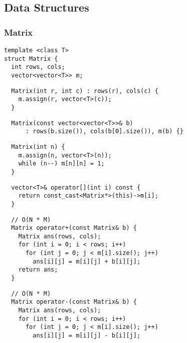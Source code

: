 \documentclass[twoside]{article}
\begin{document}
\begin{multicols*}{2}
\subsection*{Data Structures}
\vspace{2em}
\subsubsectionfont{\large\bfseries\sffamily\underline}
\subsubsection*{Matrix}
\begin{verbatim}
template <class T>
struct Matrix {
  int rows, cols;
  vector<vector<T>> m;
\end{verbatim}
\vspace{-12pt}
\begin{verbatim}
  Matrix(int r, int c) : rows(r), cols(c) {
    m.assign(r, vector<T>(c));
  }
\end{verbatim}
\vspace{-12pt}
\begin{verbatim}
  Matrix(const vector<vector<T>>& b)
      : rows(b.size()), cols(b[0].size()), m(b) {}
\end{verbatim}
\vspace{-12pt}
\begin{verbatim}
  Matrix(int n) {
    m.assign(n, vector<T>(n));
    while (n--) m[n][n] = 1;
  }
\end{verbatim}
\vspace{-12pt}
\begin{verbatim}
  vector<T>& operator[](int i) const {
    return const_cast<Matrix*>(this)->m[i];
  }
\end{verbatim}
\vspace{-12pt}
\begin{verbatim}
  // O(N * M)
  Matrix operator+(const Matrix& b) {
    Matrix ans(rows, cols);
    for (int i = 0; i < rows; i++)
      for (int j = 0; j < m[i].size(); j++)
        ans[i][j] = m[i][j] + b[i][j];
    return ans;
  }
\end{verbatim}
\vspace{-12pt}
\begin{verbatim}
  // O(N * M)
  Matrix operator-(const Matrix& b) {
    Matrix ans(rows, cols);
    for (int i = 0; i < rows; i++)
      for (int j = 0; j < m[i].size(); j++)
        ans[i][j] = m[i][j] - b[i][j];

\end{verbatim}
\end{multicols*}
\end{document}
